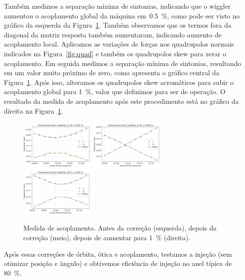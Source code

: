 \documentclass[a4paper,
               keeplastbox,   %
               ]{jacow}
\begin{document}
Também medimos a separação mínima de sintonias, indicando que o wiggler aumentou o acoplamento global da máquina em~\SI{0.5}{\percent}, como pode ser visto no gráfico da esquerda da Figura~\ref{fig:coup}. Também observamos que os termos fora da diagonal da matriz resposta também aumentaram, indicando aumento de acoplamento local. Aplicamos as variações de forças nos quadrupolos normais indicados na Figura~\ref{fig:quad} e também os quadrupolos skew para zerar o acoplamento. Em seguida medimos a separação mínima de sintonias, resultando em um valor muito próximo de zero, como apresenta o gráfico central da Figura~\ref{fig:coup}. Após isso, alteramos os quadrupolos skew acromáticos para subir o acoplamento global para \SI{1}{\percent}, valor que definimos para ser de operação. O resultado da medida de acoplamento após este procedimento está no gráfico da direita na Figura~\ref{fig:coup}.
\begin{figure}
    \centering
    \includegraphics[width=0.33\textwidth]{coupling_W180_n01.png}
    \includegraphics[width=0.33\textwidth]{coupling_W180_n01_coup_corr.png}
    \includegraphics[width=0.33\textwidth]{coupling_W180_n01_coup_corr_to_1pc.png}
    \caption{Medida de acoplamento. Antes da correção (esquerda), depois da correção (meio), depois de aumentar para \SI{1}{\percent} (direita).}
    \label{fig:coup}
\end{figure}

Após essas correções de órbita, ótica e acoplamento, testamos a injeção (sem otimizar posição e ângulo) e obtivemos eficiência de injeção no anel típica de \SI{80}{\percent}.
\end{document}
